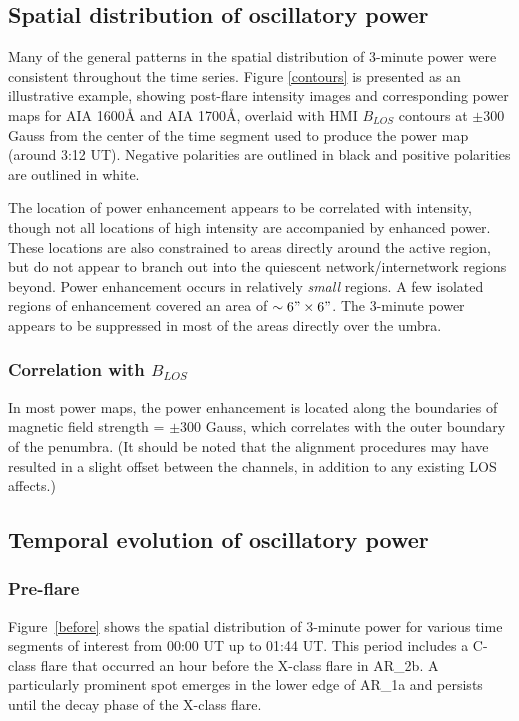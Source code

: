 
\subsection{Spatial distribution of oscillatory power}

Many of the general patterns in the spatial distribution of 3-minute power
were consistent throughout the time series.
Figure \ref{contours} is presented as an illustrative example,
showing post-flare
intensity images and corresponding power maps for
AIA 1600\AA{} and AIA 1700\AA{}, overlaid with
HMI $B_{LOS}$ contours at $\pm$300 Gauss
from the center of the time segment used to produce the power map
(around 3:12 UT).
Negative polarities are outlined in black and
positive polarities are outlined in white.

The location of power enhancement appears to be correlated with
intensity, though not all locations of high intensity are accompanied by
enhanced power.
These locations are also constrained to areas
directly around the active region, but do not appear to branch out into the quiescent
network/internetwork regions beyond.
Power enhancement occurs in relatively \emph{small} regions.
A few isolated regions of enhancement covered an area of
$\sim 6" \times 6"$.
The 3-minute power appears to be suppressed in most of the areas
directly over the umbra.


\subsubsection{Correlation with $B_{LOS}$}

In most power maps, the power enhancement
is located along the boundaries of magnetic field
strength = $\pm$300 Gauss,
which correlates with the outer boundary of the penumbra.
(It should be noted that the alignment procedures may have resulted in a slight
offset between the channels, in addition to any existing LOS affects.)

\subsection{Temporal evolution of oscillatory power}\label{time}

\subsubsection{Pre-flare}

Figure~\ref{before} shows the spatial distribution of 3-minute power for
various time segments of interest from 00:00 UT up to 01:44 UT.
This period includes a C-class flare that occurred an hour before the
X-class flare in AR\_2b.
A particularly prominent spot emerges in the lower edge of AR\_1a
and persists until the decay phase of the X-class flare.


